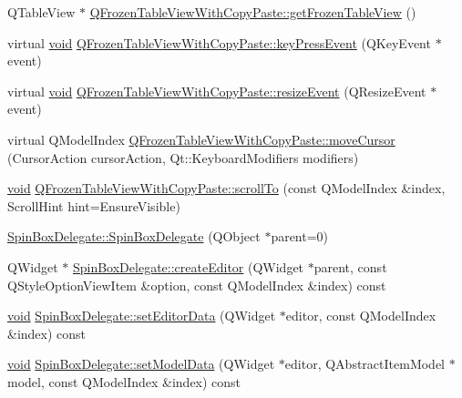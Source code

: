\begin{DoxyCompactItemize}
\item 
\-Q\-Table\-View $\ast$ \hyperlink{group___telemetry_scheduler_gadget_plugin_ga3ed87e397a7271b4bec6f92fb2e13842}{\-Q\-Frozen\-Table\-View\-With\-Copy\-Paste\-::get\-Frozen\-Table\-View} ()
\item 
virtual \hyperlink{group___u_a_v_objects_plugin_ga444cf2ff3f0ecbe028adce838d373f5c}{void} \hyperlink{group___telemetry_scheduler_gadget_plugin_ga9cb95e3479a049f0a4c84c58b19e7adb}{\-Q\-Frozen\-Table\-View\-With\-Copy\-Paste\-::key\-Press\-Event} (\-Q\-Key\-Event $\ast$event)
\item 
virtual \hyperlink{group___u_a_v_objects_plugin_ga444cf2ff3f0ecbe028adce838d373f5c}{void} \hyperlink{group___telemetry_scheduler_gadget_plugin_ga4291c6c862d2bf7c4966e2c469891dee}{\-Q\-Frozen\-Table\-View\-With\-Copy\-Paste\-::resize\-Event} (\-Q\-Resize\-Event $\ast$event)
\item 
virtual \-Q\-Model\-Index \hyperlink{group___telemetry_scheduler_gadget_plugin_gab207ef3c7d98ea292234b5d3dd605369}{\-Q\-Frozen\-Table\-View\-With\-Copy\-Paste\-::move\-Cursor} (\-Cursor\-Action cursor\-Action, \-Qt\-::\-Keyboard\-Modifiers modifiers)
\item 
\hyperlink{group___u_a_v_objects_plugin_ga444cf2ff3f0ecbe028adce838d373f5c}{void} \hyperlink{group___telemetry_scheduler_gadget_plugin_ga5382af895e6230f2a8179afc8f3febd0}{\-Q\-Frozen\-Table\-View\-With\-Copy\-Paste\-::scroll\-To} (const \-Q\-Model\-Index \&index, \-Scroll\-Hint hint=\-Ensure\-Visible)
\item 
\hyperlink{group___telemetry_scheduler_gadget_plugin_gabf1b830266511d0237c97b46f49e01f9}{\-Spin\-Box\-Delegate\-::\-Spin\-Box\-Delegate} (\-Q\-Object $\ast$parent=0)
\item 
\-Q\-Widget $\ast$ \hyperlink{group___telemetry_scheduler_gadget_plugin_gac8f09d5e036c7bd963db0e66e9ac1bfb}{\-Spin\-Box\-Delegate\-::create\-Editor} (\-Q\-Widget $\ast$parent, const \-Q\-Style\-Option\-View\-Item \&option, const \-Q\-Model\-Index \&index) const 
\item 
\hyperlink{group___u_a_v_objects_plugin_ga444cf2ff3f0ecbe028adce838d373f5c}{void} \hyperlink{group___telemetry_scheduler_gadget_plugin_gacbac1fc1091ef04b08ca9683a1d6f0ee}{\-Spin\-Box\-Delegate\-::set\-Editor\-Data} (\-Q\-Widget $\ast$editor, const \-Q\-Model\-Index \&index) const 
\item 
\hyperlink{group___u_a_v_objects_plugin_ga444cf2ff3f0ecbe028adce838d373f5c}{void} \hyperlink{group___telemetry_scheduler_gadget_plugin_ga3698304b3741f548b0b4755c1782d291}{\-Spin\-Box\-Delegate\-::set\-Model\-Data} (\-Q\-Widget $\ast$editor, \-Q\-Abstract\-Item\-Model $\ast$model, const \-Q\-Model\-Index \&index) const 

\end{DoxyCompactItemize}

